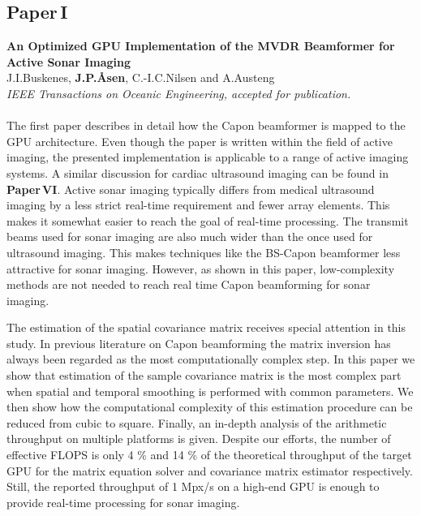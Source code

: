 \subsection{Paper\,I}
\textbf{An Optimized GPU Implementation of the MVDR Beamformer for Active Sonar Imaging}\\
J.\:I.\:Buskenes, \textbf{J.\:P.\:\AA{}sen}, C.-I.\:C.\:Nilsen and A.\:Austeng\\
{\it IEEE Transactions on Oceanic Engineering, accepted for publication.}\\\\
The first paper describes in detail how the Capon beamformer is mapped to the GPU architecture. Even though the paper is written within the field of active  imaging, the presented implementation is applicable to a range of active imaging systems. A similar discussion for cardiac ultrasound imaging can be found in \textbf{Paper\,VI}.  Active sonar imaging typically differs from medical ultrasound imaging by a less strict real-time requirement and fewer array elements. This makes it somewhat easier to reach the goal of real-time processing. The transmit beams used for sonar imaging are also much wider than the once used for ultrasound imaging. This makes techniques like the BS-Capon beamformer less attractive for sonar imaging. However, as shown in this paper, low-complexity methods are not needed to reach real time Capon beamforming for sonar imaging.

The estimation of the spatial covariance matrix receives special attention in this study. In previous literature on Capon beamforming the matrix inversion has always been regarded as the most computationally complex step. In this paper we show that estimation of the sample covariance matrix is the most complex part when spatial and temporal smoothing is performed with common parameters. We then show how the computational complexity of this estimation procedure can be reduced from cubic to square. Finally, an in-depth analysis of the arithmetic throughput on multiple platforms is given. Despite our efforts, the number of effective FLOPS is only 4 \% and 14 \% of the theoretical throughput of the target GPU for the matrix equation solver and covariance matrix estimator respectively. Still, the reported throughput of 1 Mpx/s on a high-end GPU is enough to provide real-time processing for sonar imaging.

